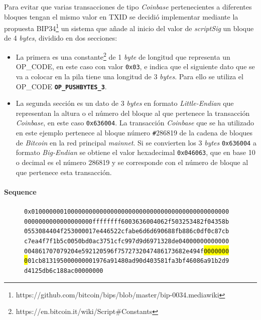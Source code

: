 \documentclass{article}
\begin{document}
    Para evitar que varias transacciones de tipo \textit{Coinbase} pertenecientes a diferentes bloques tengan el mismo valor en TXID se decidió implementar mediante la propuesta BIP34\footnote{https://github.com/bitcoin/bips/blob/master/bip-0034.mediawiki} un sistema que añade al inicio del valor de \textit{scriptSig} un bloque de 4 \textit{bytes}, dividido en dos secciones:
    
    \begin{itemize}
    \item La primera es una constante\footnote{https://en.bitcoin.it/wiki/Script\#Constants} de 1 \textit{byte} de longitud que representa un OP\_CODE, en este caso con valor \texttt{0x03}, e indica que el siguiente dato que se va a colocar en la pila tiene una longitud de 3 \textit{bytes}. Para ello se utiliza el OP\_CODE \textbf{\texttt{OP\_PUSHBYTES\_3}}.
    \item La segunda sección es un dato de 3 \textit{bytes} en formato \textit{Little-Endian} que representan la altura o el número del bloque al que pertenece la transacción \textit{Coinbase}, en este caso \texttt{0x636004}. La transacción \textit{Coinbase} que se ha utilizado en este ejemplo pertenece al bloque número \texttt{\#}286819 de la cadena de bloques de \textit{Bitcoin} en la red principal \textit{mainnet}. Si se convierten los 3 \textit{bytes} \texttt{0x636004} a formato \textit{Big-Endian} se obtiene el valor hexadecimal \texttt{0x046063}, que en base 10 o decimal es el número 286819 y se corresponde con el número de bloque al que pertenece esta transacción.
    \end{itemize}
    
    \paragraph{Sequence}
    
    \begin{figure}[H]
        \texttt{0x0100000001000000000000000000000000000000000000000000000} \\
        \texttt{0000000000000000000ffffffff6003636004062f503253482f04358b} \\
        \texttt{0553084404f253000017e446522cfabe6d6d690688fb886c0df0c87cb} \\
        \texttt{c7ea4f7f1b5c0050bd0ac3751cfc997d9d6971328de04000000000000} \\
        \texttt{004861707079204e592120596f7572732047486173682e494f\colorbox{Yellow}{0000000}} \\
        \texttt{\colorbox{Yellow}{0}01cb813195000000001976a91480ad90d403581fa3bf46086a91b2d9} \\
        \texttt{d4125db6c188ac00000000}
    \end{figure}
    
\end{document}
